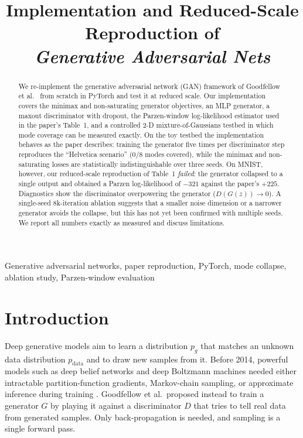 \documentclass[conference]{IEEEtran}
\newcommand{\pdata}{p_{\mathrm{data}}}
\begin{document}
\title{Implementation and Reduced-Scale Reproduction of\\
\emph{Generative Adversarial Nets}}

\author{
}

\maketitle

\begin{abstract}
We re-implement the generative adversarial network (GAN) framework of Goodfellow et al.\ \cite{goodfellow2014gan} from scratch in PyTorch and test it at reduced scale. Our implementation covers the minimax and non-saturating generator objectives, an MLP generator, a maxout discriminator with dropout, the Parzen-window log-likelihood estimator used in the paper's Table~1, and a controlled 2-D mixture-of-Gaussians testbed in which mode coverage can be measured exactly. On the toy testbed the implementation behaves as the paper describes: training the generator five times per discriminator step reproduces the ``Helvetica scenario'' (0/8 modes covered), while the minimax and non-saturating losses are statistically indistinguishable over three seeds. On MNIST, however, our reduced-scale reproduction of Table~1 \emph{failed}: the generator collapsed to a single output and obtained a Parzen log-likelihood of $-321$ against the paper's $+225$. Diagnostics show the discriminator overpowering the generator ($D(G(z))\to 0$). A single-seed 8k-iteration ablation suggests that a smaller noise dimension or a narrower generator avoids the collapse, but this has not yet been confirmed with multiple seeds. We report all numbers exactly as measured and discuss limitations.
\end{abstract}

\begin{IEEEkeywords}
Generative adversarial networks, paper reproduction, PyTorch, mode collapse, ablation study, Parzen-window evaluation
\end{IEEEkeywords}

\section{Introduction}
Deep generative models aim to learn a distribution $p_g$ that matches an unknown data distribution $\pdata$ and to draw new samples from it. Before 2014, powerful models such as deep belief networks and deep Boltzmann machines needed either intractable partition-function gradients, Markov-chain sampling, or approximate inference during training \cite{goodfellow2014gan}. Goodfellow et al.\ proposed instead to train a generator $G$ by playing it against a discriminator $D$ that tries to tell real data from generated samples. Only back-propagation is needed, and sampling is a single forward pass.
\end{document}
